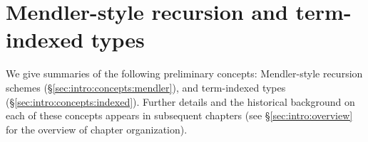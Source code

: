 \section{Mendler-style recursion and term-indexed types}
\label{sec:intro:concepts}
We give summaries of the following preliminary concepts:
Mendler-style recursion schemes (\S\ref{sec:intro:concepts:mendler}),
and term-indexed types (\S\ref{sec:intro:concepts:indexed}).
Further details and the historical background on each of these concepts
appears in subsequent chapters (see \S\ref{sec:intro:overview}
for the overview of chapter organization).


